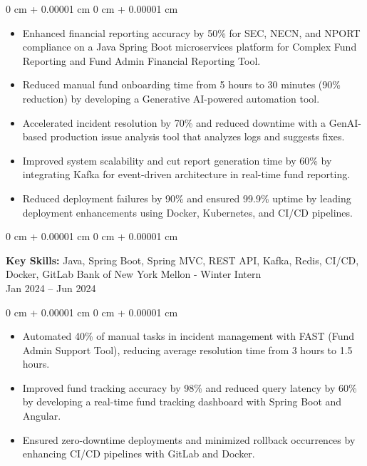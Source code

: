 \documentclass[10pt, letterpaper]{article}
\newenvironment{highlights}{
    \begin{itemize}[
        topsep=0.10 cm,
        parsep=0.10 cm,
        partopsep=0pt,
        itemsep=0pt,
        leftmargin=0 cm + 10pt
    ]
}{
    \end{itemize}
} %
\newenvironment{onecolentry}{
    \begin{adjustwidth}{
        0 cm + 0.00001 cm
    }{
        0 cm + 0.00001 cm
    }
}{
    \end{adjustwidth}
} %
\newenvironment{twocolentry}[2][]{
    \onecolentry
    \def\secondColumn{#2}
    \setcolumnwidth{\fill, 4.5 cm}
    \begin{paracol}{2}
}{
    \switchcolumn \raggedleft \secondColumn
    \end{paracol}
    \endonecolentry
} %
\begin{document}
        \vspace{0.10 cm}
        \begin{onecolentry}
            \begin{highlights}
                \item Enhanced financial reporting accuracy by 50\% for SEC, NECN, and NPORT compliance on a Java Spring Boot microservices platform for Complex Fund Reporting and Fund Admin Financial Reporting Tool.
                \item Reduced manual fund onboarding time from 5 hours to 30 minutes (90\% reduction) by developing a Generative AI-powered automation tool.
                \item Accelerated incident resolution by 70\% and reduced downtime with a GenAI-based production issue analysis tool that analyzes logs and suggests fixes.
                \item Improved system scalability and cut report generation time by 60\% by integrating Kafka for event-driven architecture in real-time fund reporting.
                \item Reduced deployment failures by 90\% and ensured 99.9\% uptime by leading deployment enhancements using Docker, Kubernetes, and CI/CD pipelines.
            \end{highlights}
        \end{onecolentry}

        \vspace{0.2 cm}

        \begin{twocolentry}{
            Bank of New York Mellon - Winter Intern \\ Jan 2024 – Jun 2024
        }
            \textbf{Key Skills:} Java, Spring Boot, Spring MVC, REST API, Kafka, Redis, CI/CD, Docker, GitLab\end{twocolentry}

        \vspace{0.10 cm}
        \begin{onecolentry}
            \begin{highlights}
                \item Automated 40\% of manual tasks in incident management with FAST (Fund Admin Support Tool), reducing average resolution time from 3 hours to 1.5 hours.
                \item Improved fund tracking accuracy by 98\% and reduced query latency by 60\% by developing a real-time fund tracking dashboard with Spring Boot and Angular.
                \item Ensured zero-downtime deployments and minimized rollback occurrences by enhancing CI/CD pipelines with GitLab and Docker.
            \end{highlights}
        \end{onecolentry}
\end{document}
